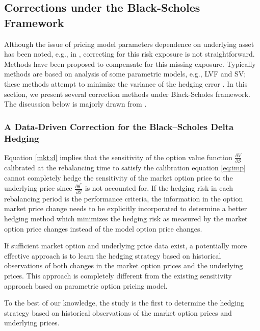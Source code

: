 \documentclass[letterpaper,12pt,titlepage,oneside,final]{book}
\numberwithin{equation}{section}
\theoremstyle{definition}
\begin{document}
\subsection{Corrections under the Black-Scholes Framework}
Although the issue of pricing model parameters dependence on underlying asset has been noted, e.g., in \citep{coleman2001,hulloptimal}, correcting for this risk exposure is not straightforward.
Methods have been proposed to compensate for this missing exposure.  Typically methods are based on analysis of some parametric models, e.g., LVF and SV; these methods attempt to minimize the variance of the hedging error \citep{hulloptimal,alexander09,Angelini09,Angelini10,Goutte13}. In this section, we present several correction methods under Black-Scholes  framework. The discussion below is majorly drawn from \cite{hulloptimal,hagan2017bartlett,bartlett2006hedging}.
\subsubsection{A Data-Driven Correction for the Black–Scholes Delta Hedging}




Equation \eqref{mkt:d} implies that the sensitivity of the option value function $\frac{\partial V}{\partial S}$ calibrated at the rebalancing time to
satisfy the calibration equation \eqref{eq:imp} cannot completely hedge  
the sensitivity of the market option price to the underlying price since $\frac{\partial \theta^*}{\partial S}$ is not accounted for.
If the hedging risk in each rebalancing period is the performance criteria, the information in the option market price change needs to be explicitly incorporated to determine a better hedging method which minimizes the hedging risk as measured by the
market option price changes instead of the model option price changes.


If sufficient market option and underlying price data exist, a potentially more effective approach is to learn the hedging strategy 
based on historical observations of both  changes in the market option prices and the underlying prices. This approach is completely different from the existing  sensitivity approach based on parametric option pricing 
model.

To the best of our knowledge, the study
\cite{hulloptimal} is the first to determine the hedging strategy based on historical observations of the market option prices and 
underlying prices.  
\end{document}
